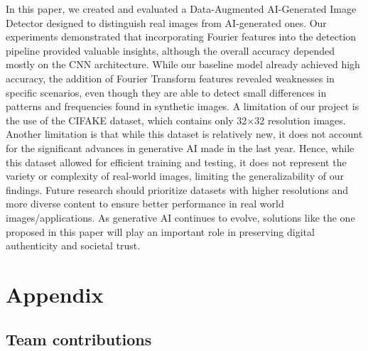 In this paper, we created and evaluated a Data-Augmented AI-Generated Image Detector designed to distinguish real images from AI-generated ones. Our experiments demonstrated that incorporating Fourier features into the detection pipeline provided valuable insights, although the overall accuracy depended mostly on the CNN architecture. While our baseline model already achieved high accuracy, the addition of Fourier Transform features revealed weaknesses in specific scenarios, even though they are able to detect small differences in patterns and frequencies found in synthetic images.
A limitation of our project is the use of the CIFAKE dataset, which contains only 32×32 resolution images. Another limitation is that while this dataset is relatively new, it does not account for the significant advances in generative AI made in the last year. Hence, while this dataset allowed for efficient training and testing, it does not represent the variety or complexity of real-world images, limiting the generalizability of our findings. Future research should prioritize datasets with higher resolutions and more diverse content to ensure better performance in real world images/applications. As generative AI continues to evolve, solutions like the one proposed in this paper will play an important role in preserving digital authenticity and societal trust.



{\small


}

\section*{Appendix}

\subsection*{Team contributions}

